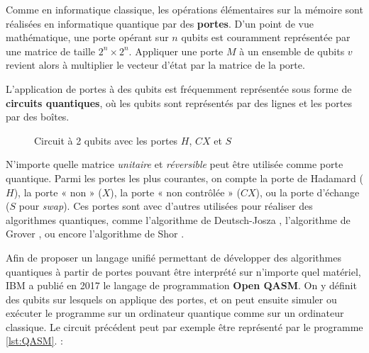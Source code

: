 \vspace{1em}

Comme en informatique classique, les opérations élémentaires sur la mémoire sont réalisées en informatique quantique par des \textbf{portes}. D'un point de vue mathématique, une porte opérant sur $n$ qubits est couramment représentée par une matrice de taille $2^n \times 2^n$. Appliquer une porte $M$ à un ensemble de qubits $v$ revient alors à multiplier le vecteur d'état par la matrice de la porte.

L'application de portes à des qubits est fréquemment représentée sous forme de \textbf{circuits quantiques}, où les qubits sont représentés par des lignes et les portes par des boîtes.

\begin{figure}
  \centering
  \caption{Circuit à 2 qubits avec les portes $H$, $CX$ et $S$}
\end{figure}

N'importe quelle matrice \textit{unitaire} et \textit{réversible} peut être utilisée comme porte quantique. Parmi les portes les plus courantes, on compte la porte de Hadamard ($H$), la porte « non » ($X$), la porte « non contrôlée » ($CX$), ou la porte d'échange ($S$ pour \textit{swap}). Ces portes sont avec d'autres utilisées pour réaliser des algorithmes quantiques, comme l'algorithme de Deutsch-Josza \cite{DJ_1992}, l'algorithme de Grover \cite{Grover_1996}, ou encore l'algorithme de Shor \cite{Shor_1997}.

\vspace{1em}

Afin de proposer un langage unifié permettant de développer des algorithmes quantiques à partir de portes pouvant être interprété sur n'importe quel matériel, IBM a publié en 2017 le langage de programmation \textbf{Open QASM}. \cite{QASM_2017} On y définit des qubits sur lesquels on applique des portes, et on peut ensuite simuler ou exécuter le programme sur un ordinateur quantique comme sur un ordinateur classique. Le circuit précédent peut par exemple être représenté par le programme \ref{lst:QASM}. :

